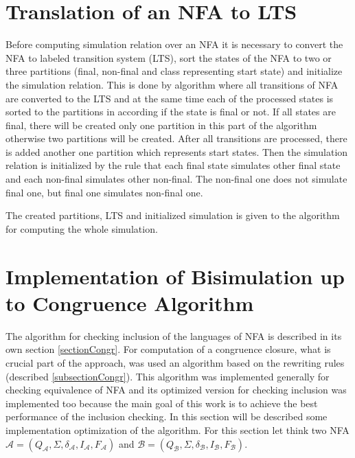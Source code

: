 \section{Translation of an NFA to LTS}
Before computing simulation relation over an NFA it is necessary to convert the NFA to labeled transition system (LTS), sort the states of the NFA to
two or three partitions (final, non-final and class representing start state) and initialize the simulation relation. This is done by algorithm where 
all transitions of NFA are converted to the LTS and at the same time each of the processed states is sorted to the partitions in according if
the state is final or not. If all states are final, there will be created only one partition in this part of the algorithm otherwise two partitions will
be created. After all transitions are processed, there is added another one partition which represents start states. Then the simulation relation is initialized
by the rule that each final state simulates other final state and each non-final simulates other non-final. The non-final one does not simulate final one, but 
final one simulates non-final one.

The created partitions, LTS and initialized simulation is given to the algorithm for computing the whole simulation. 

\section{Implementation of Bisimulation up to Congruence Algorithm}
\label{sectionCongrImpl}
The algorithm for checking inclusion of the languages of NFA is described in its own section \ref{sectionCongr}. For computation of a congruence closure, 
what is crucial part of the approach, was used an algorithm based on the rewriting rules (described \ref{subsectionCongr}). 
This algorithm was implemented generally for checking equivalence of NFA and its optimized version for checking inclusion was implemented too 
because the main goal of this work is to achieve the best performance of the inclusion checking. In this section will be described some implementation
optimization of the algorithm. For this section let think two NFA $\mathcal{A}=(Q_\mathcal{A},\Sigma,\delta_\mathcal{A},I_\mathcal{A},F_\mathcal{A})$ and
$\mathcal{B}=(Q_\mathcal{B},\Sigma,\delta_\mathcal{B},I_\mathcal{B},F_\mathcal{B})$.


